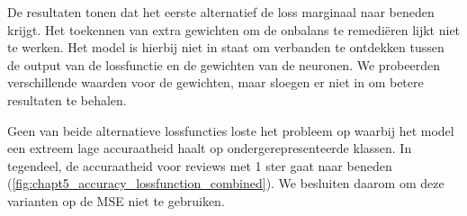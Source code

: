 De resultaten tonen dat het eerste alternatief de loss marginaal naar beneden krijgt. Het toekennen van extra gewichten om de onbalans te remediëren lijkt niet te werken. Het model is hierbij niet in staat om verbanden te ontdekken tussen de output van de lossfunctie en de gewichten van de neuronen. We probeerden verschillende waarden voor de gewichten, maar sloegen er niet in om betere resultaten te behalen.

Geen van beide alternatieve lossfuncties loste het probleem op waarbij het model een extreem lage accuraatheid haalt op ondergerepresenteerde klassen. In tegendeel, de accuraatheid voor reviews met 1 ster gaat naar beneden (\autoref{fig:chapt5_accuracy_lossfunction_combined}). We besluiten daarom om deze varianten op de MSE niet te gebruiken.




